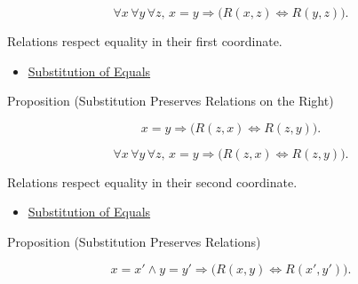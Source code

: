 \begin{remark*}
\[
\forall x\,\forall y\,\forall z,\,
x=y \Longrightarrow
\bigl(R(x,z)\Longleftrightarrow R(y,z)\bigr).
\]
\end{remark*}

\begin{remark*}[Interpretation]
Relations respect equality in their first coordinate.
\end{remark*}

\begin{dependencies}
\begin{itemize}
  \item \hyperref[ax:equality-substitution]{Substitution of Equals}
\end{itemize}
\end{dependencies}

\begin{propositionbox}{Proposition (Substitution Preserves Relations on the Right)}
\begin{proposition}
\label{prop:substitution-preserves-relations-right}
\[
x=y \Longrightarrow \bigl(R(z,x)\Longleftrightarrow R(z,y)\bigr).
\]
\end{proposition}
\end{propositionbox}

\begin{remark*}
\[
\forall x\,\forall y\,\forall z,\,
x=y \Longrightarrow
\bigl(R(z,x)\Longleftrightarrow R(z,y)\bigr).
\]
\end{remark*}

\begin{remark*}[Interpretation]
Relations respect equality in their second coordinate.
\end{remark*}

\begin{dependencies}
\begin{itemize}
  \item \hyperref[ax:equality-substitution]{Substitution of Equals}
\end{itemize}
\end{dependencies}

\begin{propositionbox}{Proposition (Substitution Preserves Relations)}
\begin{proposition}
\label{prop:substitution-preserves-relations-full}
\[
x=x' \land y=y' \Longrightarrow
\bigl(R(x,y)\Longleftrightarrow R(x',y')\bigr).
\]
\end{proposition}
\end{propositionbox}

